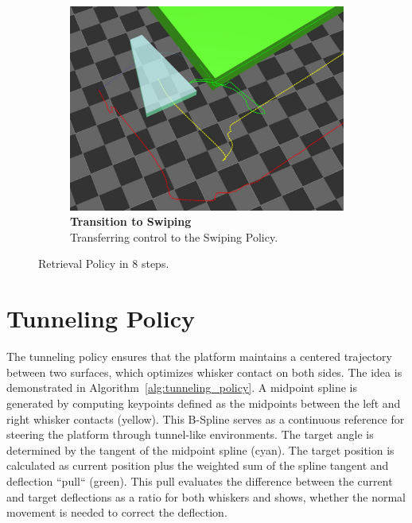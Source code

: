 \begin{figure}[H]
\begin{subfigure}[b]{0.48\textwidth}
        \label{fig:retrieval-3-2}
    \end{subfigure}\hfill
    \begin{subfigure}[b]{0.48\textwidth}
        \centering
        \captionsetup{justification=centering}
        \includegraphics[width=\textwidth]{figures/retrieval/trajectory}
        \caption{\textbf{Transition to Swiping}\\Transferring control to the Swiping Policy.}
        \label{fig:retrieval-3-3}
    \end{subfigure}
    \caption{Retrieval Policy in 8 steps.}
    \label{fig:retrieval}
\end{figure}


\section{Tunneling Policy}

The tunneling policy ensures that the platform maintains a centered trajectory between two surfaces, which optimizes whisker contact on both sides.
The idea is demonstrated in Algorithm~\ref{alg:tunneling_policy}.
A midpoint spline is generated by computing keypoints defined as the midpoints between the left and right whisker contacts (yellow).
This B-Spline serves as a continuous reference for steering the platform through tunnel-like environments.
The target angle is determined by the tangent of the midpoint spline (cyan).
The target position is calculated as current position plus the weighted sum of the spline tangent and deflection “pull“ (green).
This pull evaluates the difference between the current and target deflections as a ratio for both whiskers and shows, whether the normal movement is needed to correct the deflection.

